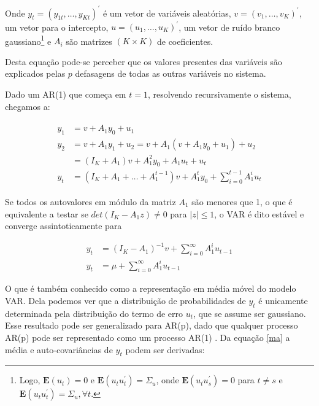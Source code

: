 \documentclass[a4paper,
               article,
               12pt,
               openany,
               oneside,
               english,
               brazil]{abntex2}
\numberwithin{equation}{section}
\begin{document}
    Onde $ y_t = (y_{1t}, \ldots, y_{Kt})^{'} $ é um vetor de variáveis aleatórias, $ v  = (v_{1}, \ldots, v_{K})^{'}  $, um vetor para o intercepto, $ u = (u_{1}, \ldots, u_{K})^{'} $, um vetor de ruído branco gaussiano\footnote{Logo, $ \mathbf{E}(u_t) = 0 $ e $ \mathbf{E}(u_t u^{'}_t) = \Sigma_{u} $, onde $ \mathbf{E}(u_tu^{'}_s) = 0 $ para $ t \neq s $ e $ \mathbf{E}(u_t u^{'}_t) = \Sigma_u, \forall t $.} e $ A_i $ são matrizes $ (K \times K) $ de coeficientes.

    Desta equação pode-se perceber que os valores presentes das variáveis são explicados pelas $ p $ defasagens de todas as outras variáveis no sistema.

    Dado um AR(1) que começa em $ t = 1 $, resolvendo recursivamente o sistema, chegamos a:

    \begin{align}
        \label{VAR1}
        \begin{aligned}
        y_1 &= v + A_1 y_0 + u_1 \\
        y_2 &= v + A_1 y_1 + u_2 = v + A_1(v + A_1y_0 + u_1) + u_2 \\
            &= (I_K + A_1)v + A^{2}_1 y_0 + A_1 u_t + u_t \\
        y_t &= (I_K + A_1 + \dots + A^{t-1}_1)v + A^{t}_1 y_0 + \sum^{t-1}_{i=0} A^{i}_1 u_t
        \end{aligned}
    \end{align}

    Se todos os autovalores em módulo da matriz $ A_1 $ são menores que 1, o que é equivalente a testar se $ det(I_{K} - A_1z) \neq 0 $ para $ \lvert z \rvert \leq 1 $, o VAR é dito estável e converge assintoticamente para

    \begin{equation}
        \label{ma}
        \begin{aligned}
        y_t &= (I_K - A_1)^{-1} v + \sum^{\infty}_{i=0} A^{i}_1 u_{t-1} \\
        y_t &= \mu + \sum^{\infty}_{i=0} A^{i}_1 u_{t-1}
        \end{aligned}
    \end{equation}

    O que é também conhecido como a representação em média móvel do modelo VAR\@ \cite[18]{lutkepool}. Dela podemos ver que a distribuição de probabilidades de $ y_t $ é unicamente determinada pela distribuição do termo de erro $ u_t $, que se assume ser gaussiano. Esse resultado pode ser generalizado para AR(p), dado que qualquer processo AR(p) pode ser representado como um processo AR(1) \cite[p.~15]{lutkepool}. Da equação \eqref{ma} a média e auto-covariâncias de $ y_t $ podem ser derivadas: 
\end{document}
